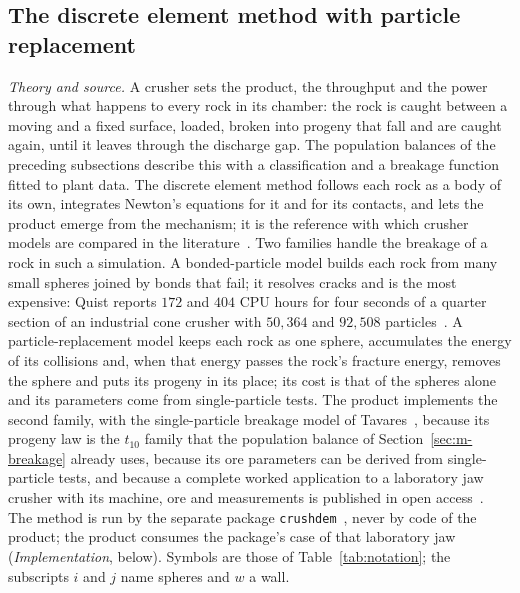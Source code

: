 \subsection{The discrete element method with particle replacement}\label{sec:m-dem}

\emph{Theory and source.} A crusher sets the product, the throughput and the power through what happens to every rock in its chamber: the rock is
caught between a moving and a fixed surface, loaded, broken into progeny that fall and are caught again, until it leaves through the discharge gap.
The population balances of the preceding subsections describe this with a classification and a breakage function fitted to plant data. The
discrete element method follows each rock as a body of its own, integrates Newton's equations for it and for its contacts, and lets the product
emerge from the mechanism; it is the reference with which crusher models are compared in the literature~\cite{cleary2015,quist2016}. Two families
handle the breakage of a rock in such a simulation. A bonded-particle model builds each rock from many small spheres joined by bonds that fail; it
resolves cracks and is the most expensive: Quist reports $172$ and $404$ CPU hours for four seconds of a quarter section of an industrial cone
crusher with $50{,}364$ and $92{,}508$ particles~\cite{quist2012}. A particle-replacement model keeps each rock as one sphere, accumulates the
energy of its collisions and, when that energy passes the rock's fracture energy, removes the sphere and puts its progeny in its place; its cost is
that of the spheres alone and its parameters come from single-particle tests. The product implements the second family, with the single-particle
breakage model of Tavares~\cite{tavares2022}, because its progeny law is the $t_{10}$ family that the population balance of Section~\ref{sec:m-breakage}
already uses, because its ore parameters can be derived from single-particle tests, and because a complete worked application to a laboratory jaw
crusher with its machine, ore and measurements is published in open access~\cite{barrios2020}. The method is run by the separate package
\texttt{crushdem}~\cite{crushdem2026}, never by code of the product; the product consumes the package's case of that laboratory jaw
(\emph{Implementation}, below). Symbols are those of Table~\ref{tab:notation}; the subscripts $i$ and $j$ name spheres and $w$ a wall.


